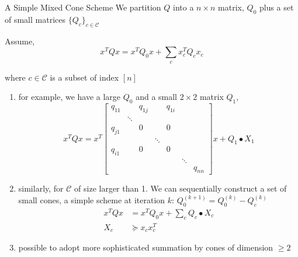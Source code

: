 \documentclass[aspectratio=1610, 10pt]{beamer}
\begin{document}
\begin{frame}[allowframebreaks]{A Simple Mixed Cone Scheme}
  We partition \(Q\) into a \(n\times n\) matrix, \(Q_0\) plus a set of small matrices \(\{Q_c\}_{c \in \mathcal C}\)

  Assume,
  \begin{equation*}
    x^TQx = x^TQ_0x + \sum_c x_c^TQ_cx_c
  \end{equation*}

  where \(c \in \mathcal C\) is a subset of index \([n]\)

  \begin{enumerate}
    \item for example, we have a large \(Q_0\) and a small \(2\times 2\) matrix \(Q_1\),
          \begin{equation*}
            x^T Q x = x^T \begin{bmatrix}
              q_{11}  &        & q_{1 j} &        & q_{1 i} &        &         \\
                      & \ddots &         &        &         &        &         \\
              q_{j 1} &        & 0       &        & 0       &        &         \\
                      &        &         & \ddots &         &        &         \\
              q_{i 1} &        & 0       &        & 0       &        &         \\
                      &        &         &        &         & \ddots &         \\
                      &        &         &        &         &        & q_{n n}
            \end{bmatrix} x + Q_1 \bullet X_1
          \end{equation*}

          \framebreak
    \item similarly, for \(\mathcal C\) of size larger than 1. We can sequentially construct a set of small cones, a simple scheme at iteration \(k\): \(Q^{(k+1)}_0 = Q^{(k)}_0 - Q_c^{(k)}\)
          \begin{align*}
            x^TQx & = x^TQ_0x + \sum_c Q_c \bullet X_c \\
            X_c   & \succeq x_c x_c^T
          \end{align*}
    \item possible to adopt more sophisticated summation by cones of dimension \(\ge 2\)
  \end{enumerate}
\end{frame}
\end{document}
